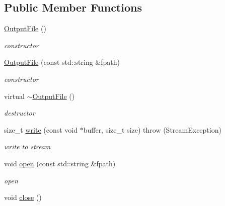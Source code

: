 \subsection*{\-Public \-Member \-Functions}
\begin{DoxyCompactItemize}
\item 
\hypertarget{classsinsy_1_1OutputFile_a95bb75917bcceaef990fb39740fbb2e5}{\hyperlink{classsinsy_1_1OutputFile_a95bb75917bcceaef990fb39740fbb2e5}{\-Output\-File} ()}\label{classsinsy_1_1OutputFile_a95bb75917bcceaef990fb39740fbb2e5}

\begin{DoxyCompactList}\small\item\em constructor \end{DoxyCompactList}\item 
\hypertarget{classsinsy_1_1OutputFile_a2ecf001f9df985d47896db2e772bbb16}{\hyperlink{classsinsy_1_1OutputFile_a2ecf001f9df985d47896db2e772bbb16}{\-Output\-File} (const std\-::string \&fpath)}\label{classsinsy_1_1OutputFile_a2ecf001f9df985d47896db2e772bbb16}

\begin{DoxyCompactList}\small\item\em constructor \end{DoxyCompactList}\item 
\hypertarget{classsinsy_1_1OutputFile_ada2c24978592ca8e9dc451fe7d074b69}{virtual \hyperlink{classsinsy_1_1OutputFile_ada2c24978592ca8e9dc451fe7d074b69}{$\sim$\-Output\-File} ()}\label{classsinsy_1_1OutputFile_ada2c24978592ca8e9dc451fe7d074b69}

\begin{DoxyCompactList}\small\item\em destructor \end{DoxyCompactList}\item 
size\-\_\-t \hyperlink{classsinsy_1_1OutputFile_a50aa606271487a08ad2eb59268007f26}{write} (const void $\ast$buffer, size\-\_\-t size)  throw (\-Stream\-Exception)
\begin{DoxyCompactList}\small\item\em write to stream \end{DoxyCompactList}\item 
\hypertarget{classsinsy_1_1OutputFile_a4cd1e0efb838d18a7d62af6ce014f9bf}{void \hyperlink{classsinsy_1_1OutputFile_a4cd1e0efb838d18a7d62af6ce014f9bf}{open} (const std\-::string \&fpath)}\label{classsinsy_1_1OutputFile_a4cd1e0efb838d18a7d62af6ce014f9bf}

\begin{DoxyCompactList}\small\item\em open \end{DoxyCompactList}\item 
\hypertarget{classsinsy_1_1OutputFile_af536aa5fb243510a0f4001d2d3a001ea}{void \hyperlink{classsinsy_1_1OutputFile_af536aa5fb243510a0f4001d2d3a001ea}{close} ()}\label{classsinsy_1_1OutputFile_af536aa5fb243510a0f4001d2d3a001ea}


\end{DoxyCompactItemize}
